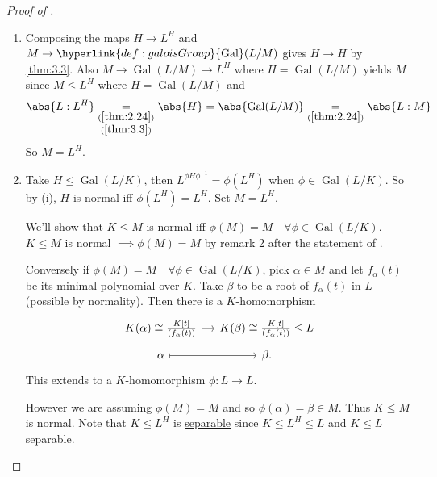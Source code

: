 \documentclass{article}
\DeclareMathOperator{\Gal}{Gal}
\begin{document}
\begin{proof}[Proof of ]
    \leavevmode
    \begin{enumerate}[label=(\roman*)]
        \item Composing the maps $H \to L^H$ and $M \to \hyperlink{def:galoisGroup}{\Gal}(L /M)$ gives $H \to H$ by \cref{thm:3.3}.
            Also $M \longrightarrow \Gal(L/M) \longrightarrow L^H$ where $H = \Gal(L/M)$ yields $M$ since $M \leq L^H$ where $H = \Gal(L/M)$ and
            \begin{equation*}
                \abs{L:L^H} \underset{\begin{subarray}{c}(\ref{thm:2.24})\\(\ref{thm:3.3})\end{subarray}}{=} \abs{H} = \abs{\Gal(L/M)} \underset{(\ref{thm:2.24})}{=} \abs{L:M}
            \end{equation*}
            So $M = L^H$.
        \item Take $H \leq \Gal(L/K)$, then $L^{\phi H \phi^{-1}} = \phi(L^H)$ when $\phi \in \Gal(L/K)$.
            So by (i), $H$ is \hyperlink{def:normal}{normal} iff $\phi(L^H) = L^H$. Set $M = L^H$.

            We'll show that $K \leq M$ is normal iff $\phi(M) = M \quad \forall \phi \in \Gal(L/K)$.
            $K \leq M$ is normal $\implies \phi(M) = M$ by remark 2 after the statement of .

            Conversely if $\phi(M) = M \quad \forall \phi \in \Gal(L/K)$, pick $\alpha \in M$ and let $f_\alpha(t)$ be its minimal polynomial over $K$.
            Take $\beta$ to be a root of $f_\alpha(t)$ in $L$ (possible by normality).
            Then there is a $K$-homomorphism
            \begin{equation*}
                \begin{tikzcd}[row sep=tiny, column sep=small]
                    K(\alpha) \cong \frac{K[t]}{(f_\alpha(t))} \ar[r] & K(\beta) \cong \frac{K[t]}{(f_\alpha(t))} \leq L \\
                    \alpha \ar[r, mapsto] & \beta.
                \end{tikzcd}
            \end{equation*}
            This extends to a $K$-homomorphism $\phi:L \to L$.

            However we are assuming $\phi(M) = M$ and so $\phi(\alpha) = \beta \in M$. Thus $K \leq M$ is normal.
            Note that $K \leq L^H$ is \hyperlink{def:separableExt}{separable} since $K \leq L^H \leq L$ and $K \leq L$ separable.


\end{enumerate}
\end{proof}
\end{document}
